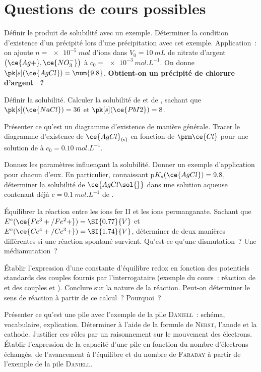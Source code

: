 \documentclass[a4paper, 11pt, final, garamond]{book}
\begin{document}
\section{Questions de cours possibles}
\begin{enumerate}[label=\sqenumi]
	\litem{23pt}{\str}%
	Définir le produit de solubilité avec un exemple. Déterminer la
	condition d'existence d'un précipité lors d'une précipitation avec cet
	exemple. Application~: on ajoute $n = \SI{e-5}{mol}$ d'ions 
	dans $V_0 = \SI{10}{mL}$ de nitrate d'argent $\left(\ce{Ag+},
		\ce{NO_3^-}
		\right)$ à $c_0 = \SI{e-3}{mol.L^{-1}}$. On donne $\pk[s](\ce{AgCl}) =
		\num{9.8}$. \textbf{Obtient-on un précipité de chlorure d'argent
		~?}

	\litem{23pt}{\str}%
	Définir la solubilité. Calculer la solubilité de  et de
	, sachant que $\pk[s](\ce{NaCl}) = 36$ et $\pk[s](\ce{PbI2}) =
		8$.

	\litem{23pt}{\str}%
	Présenter ce qu'est un diagramme d'existence de manière générale.
	Tracer le diagramme d'existence de $\ce{AgCl}_{\rm(s)}$ en fonction de
	$\prm \ce{Cl}$ pour une solution de  à $c_0 =
		\SI{0.10}{mol.L^{-1}}$.

	\litem{23pt}{\strr}%
	Donnez les paramètres influençant la solubilité. Donner un exemple
	d'application pour chacun d'eux. En particulier, connaissant
	p$K_s(\ce{AgCl}) = 9.8$, déterminer la solubilité de $\ce{AgCl\sol{}}$
	dans une solution aqueuse contenant déjà $c = \SI{0.1}{mol.L^{-1}}$ de
	.

	\litem{23pt}{\str}%
	Équilibrer la réaction entre les ions fer II et les ions permanganate.
	Sachant que $E^\circ(\ce{Fe^3+/Fe^2+}) = \SI{0.77}{V}$ et
	$E^\circ(\ce{Ce^4+/Ce^3+}) = \SI{1.74}{V}$, déterminer de deux manières
	différentes si une réaction spontané survient. Qu'est-ce qu'une
	dismutation~? Une médiamutation~?

	\litem{23pt}{\strr}%
	Établir l'expression d'une constante d'équilibre redox en fonction des
	potentiels standards des couples fournis par l'interrogataire (exemple du
	cours~: réaction de  et  des couples  et
	). Conclure sur la nature de la réaction. Peut-on
	déterminer le sens de réaction à partir de ce calcul~? Pourquoi~?

	\litem{23pt}{\strr}%
	Présenter ce qu'est une pile avec l'exemple de la pile
	\textsc{Daniell}~: schéma, vocabulaire, explication. Déterminer à l'aide
	de la formule de \textsc{Nerst}, l'anode et la cathode. Justifier ces
	rôles par un raisonnement sur le mouvement des électrons. Établir
	l'expression de la capacité d'une pile en fonction du nombre d'électrons
	échangés, de l'avancement à l'équilibre et du nombre de \textsc{Faraday}
	à partir de l'exemple de la pile \textsc{Daniell}.


\end{enumerate}
\end{document}

